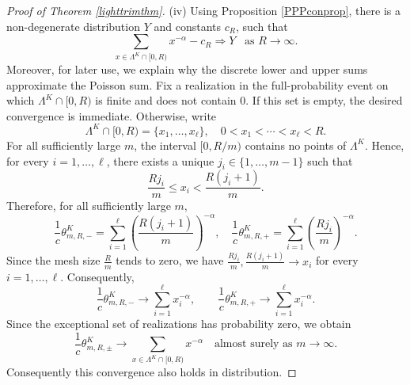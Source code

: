 \documentclass[11pt,twoside,a4paper,reqno]{amsart}
\newcommand{\as}[1]{\text{as } #1 \rightarrow\infty}
\begin{document}
\begin{proof}[Proof of Theorem \ref{lighttrimthm}]
(iv)
Using Proposition \ref{PPPconprop}, there is a non-degenerate distribution $Y$ and constants $c_R$,  such that
\begin{equation*}
\sum_{x\in \Lambda^K \cap [0,R)} x^{-\alpha}- c_R \Rightarrow Y \;\;\; \as{R}.
\end{equation*}
Moreover, for later use, we explain why the discrete lower and upper sums approximate the Poisson sum. Fix a realization in the full-probability event on which $\Lambda^K\cap[0,R)$ is finite and does not contain $0$. If this set is empty, the desired convergence is immediate. Otherwise, write
\begin{equation*}
\Lambda^K\cap[0,R)=\{x_1,\dots,x_\ell\},\quad 0<x_1<\cdots<x_\ell<R.
\end{equation*}
For all sufficiently large $m$, the interval $[0,R/m)$ contains no points of $\Lambda^K$. Hence, for every $i=1,\dots,\ell$, there exists a unique $j_i\in\{1,\dots,m-1\}$ such that
\begin{equation*}
\frac{Rj_i}{m}\leq x_i<\frac{R(j_i+1)}{m}.
\end{equation*}
Therefore, for all sufficiently large $m$,
\begin{equation*}\frac{1}{c}\theta^K_{m,R,-}=
\sum_{i=1}^{\ell}\left(\frac{R(j_i+1)}{m}\right)^{-\alpha},
\quad\frac{1}{c}\theta^K_{m,R,+}=
\sum_{i=1}^{\ell}\left(\frac{Rj_i}{m}\right)^{-\alpha}.
\end{equation*}
Since the mesh size $\frac{R}{m}$ tends to zero, we have
$\frac{Rj_i}{m},\frac{R(j_i+1)}{m}\rightarrow x_i$
for every $i=1,\dots,\ell$. Consequently,
\begin{equation*}
\frac{1}{c}\theta^K_{m,R,-}
\rightarrow
\sum_{i=1}^{\ell}x_i^{-\alpha},
\qquad
\frac{1}{c}\theta^K_{m,R,+}
\rightarrow
\sum_{i=1}^{\ell}x_i^{-\alpha}.
\end{equation*}
Since the exceptional set of realizations has probability zero, we obtain
\begin{equation}\label{poisriesumcon}
\frac{1}{c}\theta^K_{m,R,\pm}
\rightarrow
\sum_{x\in\Lambda^K\cap[0,R)}x^{-\alpha}
\quad\text{almost surely as }m\to\infty .
\end{equation}
Consequently this convergence also holds in distribution.


\end{proof}
\end{document}
